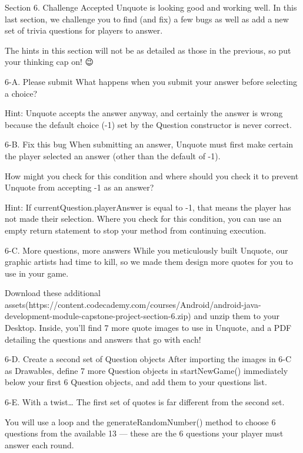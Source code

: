 Section 6. Challenge Accepted
                Unquote is looking good and working well. In this last section, we challenge you to find (and fix) a few bugs as well as add a new set of trivia questions for players to answer.

                The hints in this section will not be as detailed as those in the previous, so put your thinking cap on! 😉

        6-A. Please submit
                What happens when you submit your answer before selecting a choice?

                        Hint: Unquote accepts the answer anyway, and certainly the answer is wrong because the default choice (-1) set by the Question constructor is never correct.
        
        6-B. Fix this bug
                When submitting an answer, Unquote must first make certain the player selected an answer (other than the default of -1).

                How might you check for this condition and where should you check it to prevent Unquote from accepting -1 as an answer?

                        Hint: If currentQuestion.playerAnswer is equal to -1, that means the player has not made their selection.
                        Where you check for this condition, you can use an empty return statement to stop your method from continuing execution.
        
        6-C. More questions, more answers
                While you meticulously built Unquote, our graphic artists had time to kill, so we made them design more quotes for you to use in your game.

                Download these additional assets(https://content.codecademy.com/courses/Android/android-java-development-module-capstone-project-section-6.zip) and unzip them to your Desktop. Inside, you’ll find 7 more quote images to use in Unquote, and a PDF detailing the questions and answers that go with each!

        6-D. Create a second set of Question objects
                After importing the images in 6-C as Drawables, define 7 more Question objects in startNewGame() immediately below your first 6 Question objects, and add them to your questions list.

        6-E. With a twist…
                The first set of quotes is far different from the second set.

                You will use a loop and the generateRandomNumber() method to choose 6 questions from the available 13 — these are the 6 questions your player must answer each round.

